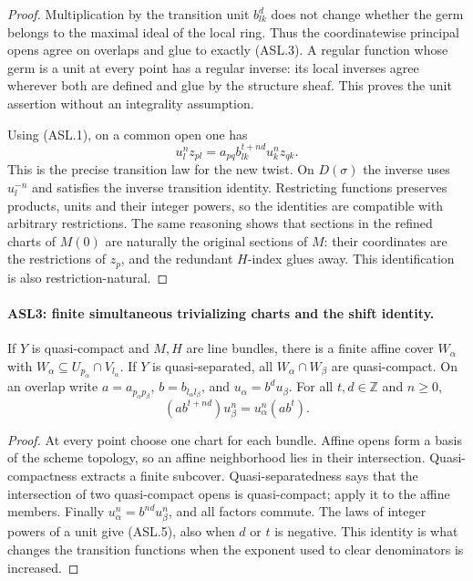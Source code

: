 \begin{proof}
Multiplication by the transition unit $b_{lk}^d$ does not change
whether the germ belongs to the maximal ideal of the local ring.
Thus the coordinatewise principal opens agree on overlaps and glue
to exactly (ASL.3).  A regular function whose germ is a unit at every
point has a regular inverse: its local inverses agree wherever both
are defined and glue by the structure sheaf.  This proves the unit
assertion without an integrality assumption.

Using (ASL.1), on a common open one has
\[
 u_l^nz_{pl}
 =a_{pq}b_{lk}^{t+nd}u_k^nz_{qk}.                 \tag{ASL.4}
\]
This is the precise transition law for the new twist.  On
$D(\sigma)$ the inverse uses $u_l^{-n}$ and satisfies the inverse
transition identity.  Restricting functions preserves products,
units and their integer powers, so the identities are compatible
with arbitrary restrictions.  The same reasoning shows that
sections in the refined charts of $M(0)$ are naturally the original
sections of $M$: their coordinates are the restrictions of $z_p$,
and the redundant $H$-index glues away.  This identification is also
restriction-natural.
\end{proof}

\paragraph{ASL3: finite simultaneous trivializing charts and the shift identity.}
\label{claim:ASL3}
If $Y$ is quasi-compact and $M,H$ are line bundles, there is a
finite affine cover $W_\alpha$ with
$W_\alpha\subseteq U_{p_\alpha}\cap V_{l_\alpha}$.
If $Y$ is quasi-separated, all $W_\alpha\cap W_\beta$ are
quasi-compact.  On an overlap write $a=a_{p_\alpha p_\beta}$,
$b=b_{l_\alpha l_\beta}$, and $u_\alpha=b^du_\beta$.
For all $t,d\in\mathbb Z$ and $n\ge0$,
\[
 (ab^{t+nd})u_\beta^n=u_\alpha^n(ab^t).          \tag{ASL.5}
\]

\begin{proof}
At every point choose one chart for each bundle.  Affine opens
form a basis of the scheme topology, so an affine neighborhood
lies in their intersection.  Quasi-compactness extracts a finite
subcover.  Quasi-separatedness says that the intersection of
two quasi-compact opens is quasi-compact; apply it to the affine
members.  Finally $u_\alpha^n=b^{nd}u_\beta^n$, and all factors
commute.  The laws of integer powers of a unit give (ASL.5), also
when $d$ or $t$ is negative.  This identity is what changes the
transition functions when the exponent used to clear denominators
is increased.
\end{proof}

